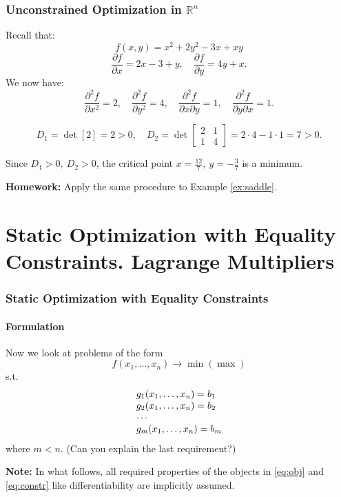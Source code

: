 \documentclass[10pt]{beamer}
\theoremstyle{definition}
\begin{document}
\begin{frame}[fragile]
\frametitle{Unconstrained Optimization in $ \mathbb{R}^n $}
\begin{example} Recall that:
\[ f(x,y) = x^2 +2y^2-3x+xy \]
\[ \frac{\partial f}{\partial x} = 2x-3+y,\quad \frac{\partial f}{\partial y} = 4y+x.\]
We now have:
\[ \frac{\partial^2 f}{\partial x^2} = 2, \quad \frac{\partial^2 f}{\partial y^2} = 4,\quad \frac{\partial^2 f}{\partial x \partial y} = 1, \quad  \frac{\partial^2 f}{\partial y \partial x } = 1. \]

\[ D_1 = \det [2] = 2>0, \quad D_2 = \det \begin{bmatrix}
2 & 1\\
1 & 4
\end{bmatrix} = 2 \cdot 4 - 1 \cdot 1 = 7 > 0. \]

Since $ D_1>0,~D_2>0 $, the critical point $ x=\frac{12}{7},~y=-\frac{3}{7} $ is a minimum.
\label{ex:locminR2cont}
\end{example}

\textbf{Homework:} Apply the same procedure to Example \ref{ex:saddle}.
\end{frame}

\section{Static Optimization with Equality Constraints. Lagrange Multipliers}\label{sec:Lagr}

\begin{frame}[fragile]
\frametitle{Static Optimization with Equality Constraints}
\framesubtitle{Formulation}
Now we look at problems of the form
\begin{equation}
f(x_1,\ldots,x_n)\rightarrow \min (\max)
\label{eq:obj}
\end{equation}
s.t.
\begin{equation}
\begin{array}{l l l}
g_1(x_1,\ldots,x_n) = b_1\\
g_2(x_1,\ldots,x_n) = b_2\\
\cdots \\
g_m(x_1,\ldots,x_n) = b_m\\
\end{array}
\label{eq:constr}
\end{equation}
where $ m<n $. (Can you explain the last requirement?) \bigskip

\textbf{Note:} In what follows, all required properties of the objects in \eqref{eq:obj} and \eqref{eq:constr} like differentiability are implicitly assumed.
\end{frame}
\end{document}
